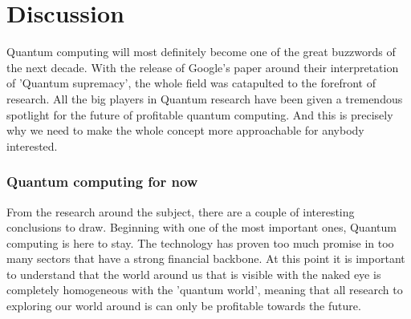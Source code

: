 
\chapter{Discussion}
\label{ch:conclusie}

Quantum computing will most definitely become one of the great buzzwords of the next decade. With the release of Google's paper \textcite{Google2019} around their interpretation of 'Quantum supremacy', the whole field was catapulted to the forefront of research. All the big players in Quantum research have been given a tremendous spotlight for the future of profitable quantum computing. And this is precisely why we need to make the whole concept more approachable for anybody interested.

\subsection{Quantum computing for now}

From the research around the subject, there are a couple of interesting conclusions to draw. Beginning with one of the most important ones, Quantum computing is here to stay. The technology has proven too much promise in too many sectors that have a strong financial backbone. At this point it is important to understand that the world around us that is visible with the naked eye is completely homogeneous with the 'quantum world', meaning that all research to exploring our world around is can only be profitable towards the future.

